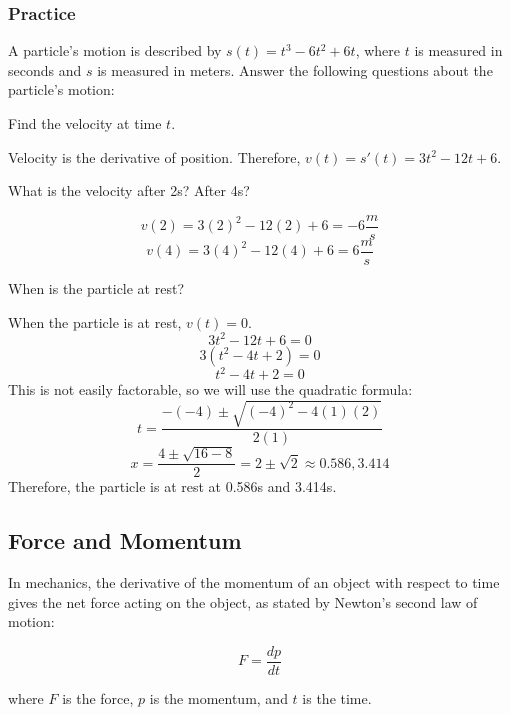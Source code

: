 \subsubsection{Practice}

A particle's motion is described by $s(t) = t^3-6t^2+6t$, where $t$ is measured in seconds and $s$ is measured in meters. Answer the following questions about the particle's motion:
\begin{Exercise}[label=velacc1]
Find the velocity at time $t$.
\end{Exercise}

\begin{Answer}[ref=velacc1]
Velocity is the derivative of position. Therefore, $v(t) = s'(t) = 3t^2-12t+6$.
\end{Answer}

\begin{Exercise}[label=velacc2]
What is the velocity after 2s? After 4s?
\end{Exercise}

\begin{Answer}[ref=velacc2]
$$v(2) = 3(2)^2-12(2)+6=-6 \frac{m}{s}$$
$$v(4) = 3(4)^2-12(4)+6=6\frac{m}{s}$$
\end{Answer}

\begin{Exercise}[label=velacc3]
When is the particle at rest?
\end{Exercise}

\begin{Answer}[ref=velacc3]
When the particle is at rest, $v(t) = 0$. 
$$3t^2-12t+6=0$$
$$3(t^2-4t+2)=0$$
$$t^2-4t+2=0$$
This is not easily factorable, so we will use the quadratic formula: $$t=\frac{-(-4)\pm\sqrt{(-4)^2-4(1)(2)}}{2(1)}$$
$$x=\frac{4\pm\sqrt{16-8}}{2}=2\pm\sqrt{2}\approx0.586, 3.414$$
Therefore, the particle is at rest at 0.586s and 3.414s.
\end{Answer}

\subsection{Force and Momentum}

In mechanics, the derivative of the momentum of an object with respect
to time gives the net force acting on the object, as stated by
Newton's second law of motion:

\begin{equation}
F = \frac{dp}{dt}
\end{equation}

where $F$ is the force, $p$ is the momentum, and $t$ is the time.
